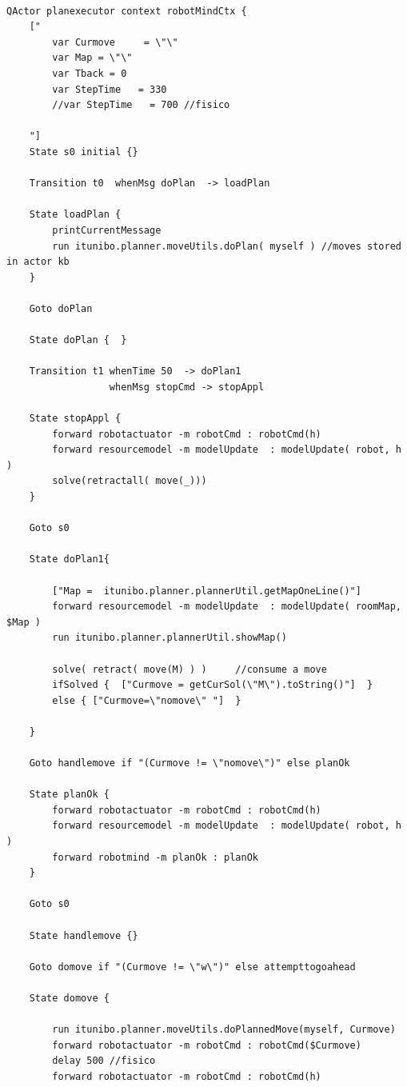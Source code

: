 \begin{lstlisting}[backgroundcolor=\color{white}, label={lst:planexecutor-ddr-sys-5}, caption={"Codice di planexecutor in ddrSystem5"}]

QActor planexecutor context robotMindCtx {
	["
		var Curmove     = \"\"  
		var Map = \"\"
		var Tback = 0
		var StepTime   = 330 
		//var StepTime   = 700 //fisico 

    "]
	State s0 initial {} 

	Transition t0  whenMsg doPlan  -> loadPlan
				 
	State loadPlan {
		printCurrentMessage
 		run itunibo.planner.moveUtils.doPlan( myself ) //moves stored in actor kb
	}
				 	
	Goto doPlan
	
 	State doPlan {	}
 	
	Transition t1 whenTime 50  -> doPlan1 		
 		          whenMsg stopCmd -> stopAppl
 		          
 	State stopAppl {
 		forward robotactuator -m robotCmd : robotCmd(h)
 		forward resourcemodel -m modelUpdate  : modelUpdate( robot, h ) 
 		solve(retractall( move(_)))
 	} 
 	
 	Goto s0
 	
 	State doPlan1{
 	
		["Map =  itunibo.planner.plannerUtil.getMapOneLine()"]
		forward resourcemodel -m modelUpdate  : modelUpdate( roomMap, $Map )
		run itunibo.planner.plannerUtil.showMap() 
		
		solve( retract( move(M) ) ) 	//consume a move
		ifSolved {  ["Curmove = getCurSol(\"M\").toString()"]  }
		else { ["Curmove=\"nomove\" "]  }

	}  
	
	Goto handlemove if "(Curmove != \"nomove\")" else planOk
	
	State planOk {
		forward robotactuator -m robotCmd : robotCmd(h)
		forward resourcemodel -m modelUpdate  : modelUpdate( robot, h ) 
		forward robotmind -m planOk : planOk 
	}
	
	Goto s0
	
	State handlemove {}
	
	Goto domove if "(Curmove != \"w\")" else attempttogoahead
	
	State domove {
		
		run itunibo.planner.moveUtils.doPlannedMove(myself, Curmove)
		forward robotactuator -m robotCmd : robotCmd($Curmove)
		delay 500 //fisico  
		forward robotactuator -m robotCmd : robotCmd(h)
	

\end{lstlisting}

